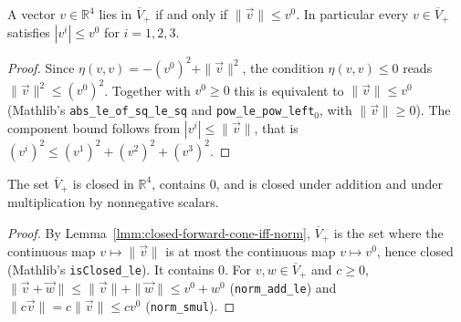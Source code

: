 \begin{lemma}
    \label{lmm:closed-forward-cone-iff-norm}
    \leanok
    A vector $v \in \mathbb{R}^4$ lies in $\overline{V}_+$ if and only if $\|\vec v\| \le v^0$. In particular every $v \in \overline{V}_+$ satisfies $|v^i| \le v^0$ for $i = 1, 2, 3$.
\end{lemma}
\begin{proof}
    \leanok
    Since $\eta(v,v) = -(v^0)^2 + \|\vec v\|^2$, the condition $\eta(v,v) \le 0$ reads $\|\vec v\|^2 \le (v^0)^2$. Together with $v^0 \ge 0$ this is equivalent to $\|\vec v\| \le v^0$ (Mathlib's \texttt{abs\_le\_of\_sq\_le\_sq} and \texttt{pow\_le\_pow\_left\ensuremath{_0}}, with $\|\vec v\| \ge 0$). The component bound follows from $|v^i| \le \|\vec v\|$, that is $(v^i)^2 \le (v^1)^2 + (v^2)^2 + (v^3)^2$.
\end{proof}

\begin{lemma}
    \label{lmm:closed-forward-cone-closed-convex}
    \leanok
    The set $\overline{V}_+$ is closed in $\mathbb{R}^4$, contains $0$, and is closed under addition and under multiplication by nonnegative scalars.
\end{lemma}
\begin{proof}
    \leanok
    By Lemma~\ref{lmm:closed-forward-cone-iff-norm}, $\overline{V}_+$ is the set where the continuous map $v \mapsto \|\vec v\|$ is at most the continuous map $v \mapsto v^0$, hence closed (Mathlib's \texttt{isClosed\_le}). It contains $0$. For $v, w \in \overline{V}_+$ and $c \ge 0$, $\|\vec v + \vec w\| \le \|\vec v\| + \|\vec w\| \le v^0 + w^0$ (\texttt{norm\_add\_le}) and $\|c\vec v\| = c\|\vec v\| \le cv^0$ (\texttt{norm\_smul}).
\end{proof}

